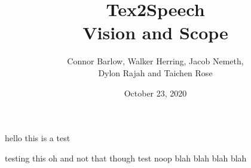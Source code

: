 \documentclass[letterpaper,12pt]{article}
\title{Tex2Speech\\Vision and Scope}
\author{Connor Barlow, Walker Herring, Jacob Nemeth,\\Dylon Rajah and Taichen Rose}
\date{October 23, 2020}
\begin{document}
\maketitle

hello this is a test

  testing this 
 oh and not that though 
test 
 noop
blah blah
blah blah



\end{document}
